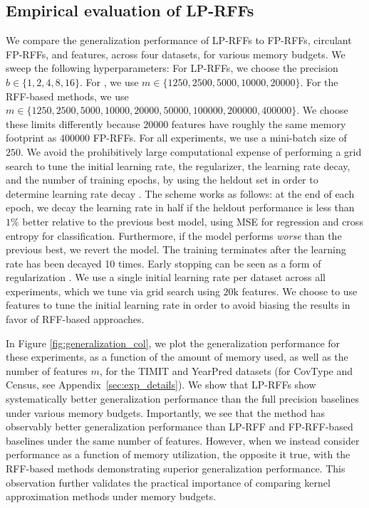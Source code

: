 \subsection{Empirical evaluation of LP-RFFs}
We compare the generalization performance of LP-RFFs to FP-RFFs, circulant FP-RFFs, and \Nystrom features, across four datasets, for various memory budgets.  We sweep the following hyperparameters: For LP-RFFs, we choose the precision $b \in \{1,2,4,8,16\}$. For \NystromNS, we use $m \in \{1250, 2500, 5000, 10000, 20000\}$.  For the RFF-based methods, we use $m\in \{1250, 2500, 5000, 10000, 20000, 50000, 100000, 200000, 400000\}$. We choose these limits differently because $\num[group-separator={,}]{20000}$ \Nystrom features have roughly the same memory footprint as $\num[group-separator={,}]{400000}$ FP-RFFs. For all experiments, we use a mini-batch size of $250$. We avoid the prohibitively large computational expense of performing a grid search to tune the initial learning rate, the regularizer, the learning rate decay, and the number of training epochs, by using the heldout set in order to determine learning rate decay \citep{morgan1990generalization,sainath2013b,sainath2013low}. The scheme works as follows: at the end of each epoch, we decay the learning rate in half if the heldout performance is less than $1\%$ better relative to the previous best model, using MSE for regression and cross entropy for classification. Furthermore, if the model performs \textit{worse} than the previous best, we revert the model. The training terminates after the learning rate has been decayed 10 times. Early stopping can be seen as a form of regularization \citep{zhang2005boosting,wei2017early}.  We use a single initial learning rate per dataset across all experiments, which we tune via grid search using $20\text{k}$ \Nystrom features. We choose to use \Nystrom features to tune the initial learning rate in order to avoid biasing the results in favor of RFF-based approaches. 

In Figure \ref{fig:generalization_col}, we plot the generalization performance for these experiments, as a function of the amount of memory used, as well as the number of features $m$, for the TIMIT and YearPred datasets (for CovType and Census, see Appendix~\ref{sec:exp_details}). We show that LP-RFFs show systematically better generalization performance than the full precision baselines under various memory budgets. Importantly, we see that the \Nystrom method has observably better generalization performance than LP-RFF and FP-RFF-based baselines under the same number of features. However, when we instead consider performance as a function of memory utilization, the opposite it true, with the RFF-based methods demonstrating superior generalization performance. This observation further validates the practical importance of comparing kernel approximation methods under memory budgets.

